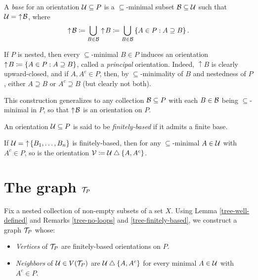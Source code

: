 \documentclass{amsart}
\begin{document}
    \begin{definition}
        A \textit{base} for an orientation $\mathcal{U}\subseteq P$ is a $\subseteq$-minimal subset $\mathcal{B}\subseteq\mathcal{U}$ such that $\mathcal{U}=\,\,\uparrow\!\mathcal{B}$, where
        \begin{equation*}
            \uparrow\!\mathcal{B}\coloneqq\bigcup_{B\in\mathcal{B}}\uparrow\!B\coloneqq\bigcup_{B\in\mathcal{B}}\left\{A\in P: A\supseteq B\right\}.
        \end{equation*}
    \end{definition}

    \begin{remark}
        If $P$ is nested, then every $\subseteq$-minimal $B\in P$ induces an orientation $\uparrow\!B\coloneqq\left\{A\in P: A\supseteq B\right\}$, called a \textit{principal} orientation. Indeed, $\uparrow\!B$ is clearly upward-closed, and if $A,A^c\in P$, then, by $\subseteq$-minimality of $B$ and nestedness of $P$, either $A\supseteq B$ or $A^c\supseteq B$ (but clearly not both).

        This construction generalizes to any collection $\mathcal{B}\subseteq P$ with each $B\in\mathcal{B}$ being $\subseteq$-minimal in $P$, so that $\uparrow\!\mathcal{B}$ is an orientation on $P$.
    \end{remark}

    \begin{definition}
        An orientation $\mathcal{U}\subseteq P$ is said to be \textit{finitely-based} if it admits a finite base.
    \end{definition}

    \begin{remark}\label{tree-finitely-based}
        If $\mathcal{U}=\,\,\uparrow\!\left\{B_1,\dots,B_n\right\}$ is finitely-based, then for any $\subseteq$-minimal $A\in\mathcal{U}$ with $A^c\in P$, so is the orientation $\mathcal{V}\coloneqq\mathcal{U}\bigtriangleup\left\{A,A^c\right\}$. {}
    \end{remark}

    \section{The graph $\mathcal{T}_P$}

    Fix a nested collection of non-empty subsets of a set $X$. Using Lemma \ref{tree-well-defined} and Remarks \ref{tree-no-loops} and \ref{tree-finitely-based}, we construct a graph $\mathcal{T}_P$ whose:
    \begin{itemize}
        \item \textit{Vertices} of $\mathcal{T}_P$ are finitely-based orientations on $P$.
        \item \textit{Neighbors} of $\mathcal{U}\in V(\mathcal{T}_P)$ are $\mathcal{U}\bigtriangleup\left\{A,A^c\right\}$ for every minimal $A\in\mathcal{U}$ with $A^c\in P$.
    \end{itemize}
\end{document}
